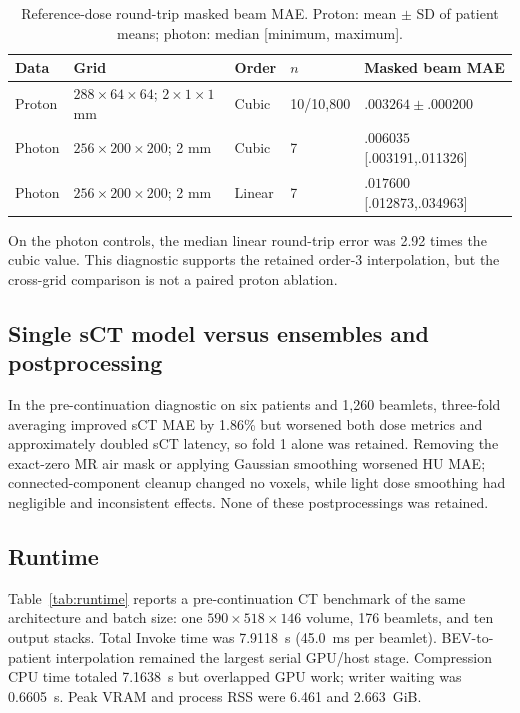 \documentclass[runningheads]{llncs}
\begin{document}
\begin{table}[h]
\caption{Reference-dose round-trip masked beam MAE. Proton: mean $\pm$ SD of
patient means; photon: median [minimum, maximum].}
\label{tab:roundtrip}
\centering
\scriptsize
\setlength{\tabcolsep}{3pt}
\begin{tabular}{@{}lllll@{}}
\toprule
Data & Grid & Order & $n$ & Masked beam MAE \\
\midrule
Proton & $288\times64\times64$; $2\times1\times1$ mm & Cubic & 10/10,800 & $.003264\pm.000200$ \\
Photon & $256\times200\times200$; 2 mm & Cubic & 7 & $.006035$ [.003191,.011326] \\
Photon & $256\times200\times200$; 2 mm & Linear & 7 & $.017600$ [.012873,.034963] \\
\bottomrule
\end{tabular}
\end{table}

On the photon controls, the median linear round-trip error was 2.92 times the
cubic value. This diagnostic supports the retained order-3 interpolation, but
the cross-grid comparison is not a paired proton ablation.

\subsection{Single sCT model versus ensembles and postprocessing}

In the pre-continuation diagnostic on six patients and 1,260 beamlets,
three-fold averaging improved sCT MAE by 1.86\% but worsened both dose metrics
and approximately doubled sCT latency, so fold 1 alone was retained. Removing
the exact-zero MR air mask or applying Gaussian smoothing worsened HU MAE;
connected-component cleanup changed no voxels, while light dose smoothing had
negligible and inconsistent effects. None of these postprocessings was retained.

\subsection{Runtime}

Table~\ref{tab:runtime} reports a pre-continuation CT benchmark of the same
architecture and batch size: one
$590\times518\times146$ volume, 176 beamlets, and ten output stacks. Total
Invoke time was 7.9118~s (45.0~ms per beamlet). BEV-to-patient interpolation
remained the largest serial GPU/host stage. Compression CPU time totaled
7.1638~s but overlapped GPU work; writer waiting was 0.6605~s. Peak VRAM and
process RSS were 6.461 and 2.663~GiB.
\end{document}
